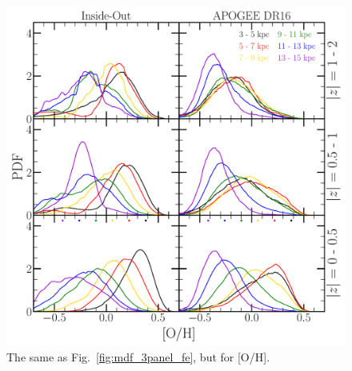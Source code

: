 \documentclass[fleqn, usenatbib]{mnras}
\begin{document}
\begin{figure} 
\centering 
\includegraphics[scale = 0.34]{mdf_3panel_o.pdf} 
\caption{The same as Fig.~\ref{fig:mdf_3panel_fe}, but for [O/H]. } 
\label{fig:mdf_3panel_o} 
\end{figure} 
\end{document}
